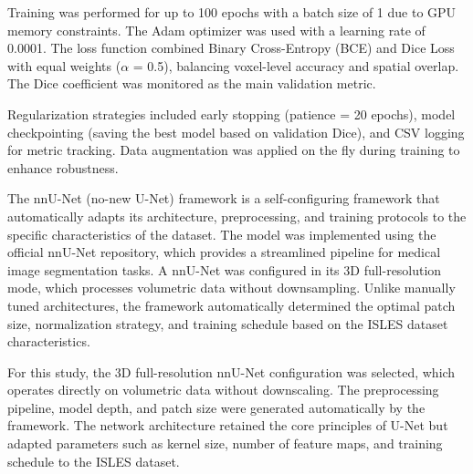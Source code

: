 \documentclass[12pt]{article}
\begin{document}
Training was performed for up to 100 epochs with a batch size of 1 due to GPU memory constraints. The Adam optimizer was used with a learning rate of 0.0001. The loss function combined Binary Cross-Entropy (BCE) and Dice Loss with equal weights ($\alpha$ = 0.5), balancing voxel-level accuracy and spatial overlap. The Dice coefficient was monitored as the main validation metric.

Regularization strategies included early stopping (patience = 20 epochs), model checkpointing (saving the best model based on validation Dice), and CSV logging for metric tracking. Data augmentation was applied on the fly during training to enhance robustness.


The nnU-Net \cite{Isensee2021} (no-new U-Net) framework is a self-configuring framework that automatically adapts its architecture, preprocessing, and training protocols to the specific characteristics of the dataset. The model was implemented using the official nnU-Net repository, which provides a streamlined pipeline for medical image segmentation tasks. A nnU-Net   was configured in its 3D full-resolution mode, which processes volumetric data without downsampling. Unlike manually tuned architectures, the framework automatically determined the optimal patch size, normalization strategy, and training schedule based on the ISLES dataset characteristics.

For this study, the 3D full-resolution nnU-Net configuration was selected, which operates directly on volumetric data without downscaling. The preprocessing pipeline, model depth, and patch size were generated automatically by the framework. The network architecture retained the core principles of U-Net but adapted parameters such as kernel size, number of feature maps, and training schedule to the ISLES dataset.
\end{document}
